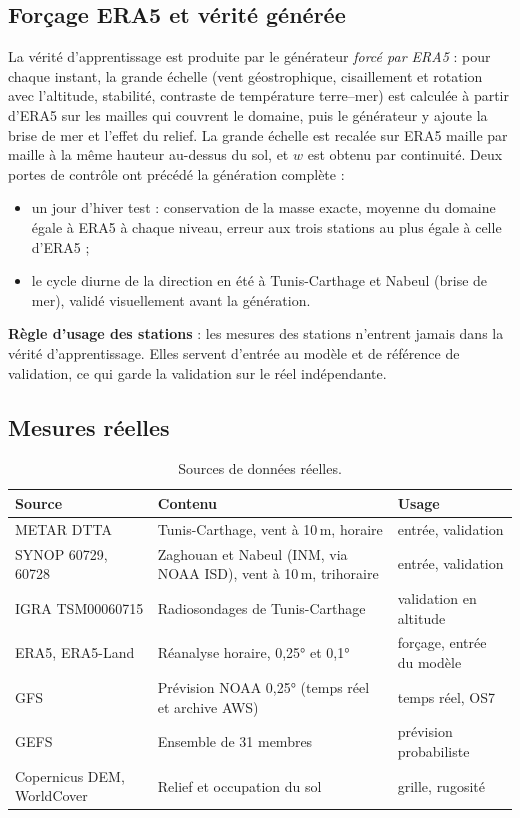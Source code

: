 \subsection{Forçage ERA5 et vérité générée}
La vérité d'apprentissage est produite par le générateur \emph{forcé par ERA5} : pour chaque
instant, la grande échelle (vent géostrophique, cisaillement et rotation avec l'altitude, stabilité,
contraste de température terre--mer) est calculée à partir d'ERA5 sur les mailles qui couvrent le
domaine, puis le générateur y ajoute la brise de mer et l'effet du relief. La grande échelle est
recalée sur ERA5 maille par maille à la même hauteur au-dessus du sol, et $w$ est obtenu par
continuité. Deux portes de contrôle ont précédé la génération complète :
\begin{itemize}
  \item un jour d'hiver test : conservation de la masse exacte, moyenne du domaine égale à ERA5 à
        chaque niveau, erreur aux trois stations au plus égale à celle d'ERA5 ;
  \item le cycle diurne de la direction en été à Tunis-Carthage et Nabeul (brise de mer), validé
        visuellement avant la génération.
\end{itemize}

\textbf{Règle d'usage des stations} : les mesures des stations n'entrent jamais dans la vérité
d'apprentissage. Elles servent d'entrée au modèle et de référence de validation, ce qui garde la
validation sur le réel indépendante.

\subsection{Mesures réelles}
\begin{table}[H]
\centering
\caption{Sources de données réelles.}
\label{tab:sources}
\begin{tabularx}{\linewidth}{@{}lXl@{}}
\toprule
Source & Contenu & Usage\\
\midrule
METAR DTTA & Tunis-Carthage, vent à 10\,m, horaire & entrée, validation\\
SYNOP 60729, 60728 & Zaghouan et Nabeul (INM, via NOAA ISD), vent à 10\,m, triho\-raire & entrée, validation\\
IGRA TSM00060715 & Radiosondages de Tunis-Carthage & validation en altitude\\
ERA5, ERA5-Land & Réanalyse horaire, 0,25° et 0,1° & forçage, entrée du modèle\\
GFS & Prévision NOAA 0,25° (temps réel et archive AWS) & temps réel, OS7\\
GEFS & Ensemble de 31 membres & prévision probabiliste\\
Copernicus DEM, WorldCover & Relief et occupation du sol & grille, rugosité\\
\bottomrule
\end{tabularx}
\end{table}

